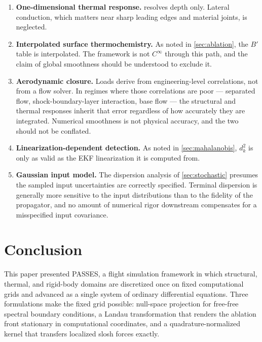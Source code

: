 \documentclass[11pt,a4paper]{article}
\theoremstyle{definition}
\numberwithin{equation}{section}
\begin{document}
\begin{enumerate}
    \item \textbf{One-dimensional thermal response.}  resolves depth only. Lateral conduction, which matters near sharp leading edges and material joints, is neglected.

    \item \textbf{Interpolated surface thermochemistry.} As noted in \cref{sec:ablation}, the $B'$ table is interpolated. The framework is not $C^\infty$ through this path, and the claim of global smoothness should be understood to exclude it.

    \item \textbf{Aerodynamic closure.} Loads derive from engineering-level correlations, not from a flow solver. In regimes where those correlations are poor --- separated flow, shock-boundary-layer interaction, base flow --- the structural and thermal responses inherit that error regardless of how accurately they are integrated. Numerical smoothness is not physical accuracy, and the two should not be conflated.

    \item \textbf{Linearization-dependent detection.} As noted in \cref{sec:mahalanobis}, $d_k^2$ is only as valid as the EKF linearization it is computed from.

    \item \textbf{Gaussian input model.} The dispersion analysis of \cref{sec:stochastic} presumes the sampled input uncertainties are correctly specified. Terminal dispersion is generally more sensitive to the input distributions than to the fidelity of the propagator, and no amount of numerical rigor downstream compensates for a misspecified input covariance.
\end{enumerate}

\section{Conclusion}
\label{sec:conclusion}

This paper presented PASSES, a flight simulation framework in which structural, thermal, and rigid-body domains are discretized once on fixed computational grids and advanced as a single system of ordinary differential equations. Three formulations make the fixed grid possible: null-space projection for free-free spectral boundary conditions, a Landau transformation that renders the ablation front stationary in computational coordinates, and a quadrature-normalized kernel that transfers localized slosh forces exactly.
\end{document}
